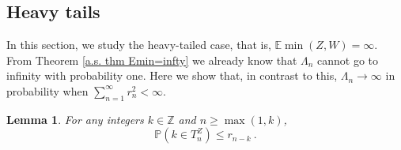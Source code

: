 \documentclass[12pt]{article}
\newcommand{\Z}{\mathbb{Z}}
\newcommand{\E}{\mathbb{E}}
\newtheorem{theorem}{Theorem}
\newtheorem{lemma}[theorem]{Lemma}
\numberwithin{equation}{section} \font\titre=cmbx12
\newcommand{\prob}[1]{\mathbb{P}\left( #1 \right)}
\newcommand{\leftmost}{L}
\newcommand{\leaves}{\Lambda}
\begin{document}
\subsection{Heavy tails}
\label{sec:heavy}

In this section, we study the heavy-tailed case, that is, $\E \min(Z,W) = \infty$. From Theorem \ref{a.s. thm Emin=infty} we already know that $\leaves_n$ cannot go to infinity with probability one. 
Here we show that, in contrast to this, $\leaves_n\to \infty$ in probability when $\sum_{n=1}^\infty r_n^2 <\infty$.

\begin{lemma} \label{r-bound}
    For any integers $k \in \Z$ and $n\ge \max(1,k)$, $$\prob{k\in T_n^Z}\le r_{n-k}~.$$
\end{lemma}
\end{document}
